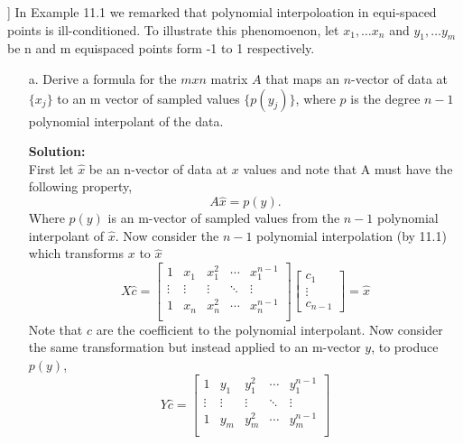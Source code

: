 \documentclass[12pt]{article}
\makeatletter
\theoremstyle{homework}
\newenvironment{exercise}[1]
{\def\@currentlabel{#1}\exercisecore}
{\endexercisecore}
\newcommand{\localhead}[1]{\par\smallskip\noindent\textbf{#1}\nobreak\\}%
\newcommand\solution{\localhead{Solution:}}
\makeatother
\begin{document}
\begin{exercise}[12.2] In Example 11.1 we remarked that polynomial interpoloation in equi-spaced points 
  is ill-conditioned. To illustrate this phenomoenon, let $x_1, \dots x_n$ and  $y_1, \dots y_m$ be n and m equispaced points form 
  -1 to 1 respectively.\\
  \begin{enumerate}
    \item[a.] Derive a formula for the $mxn$ matrix $A$ that maps an $n$-vector of data at $\{x_j\}$ to an 
    m vector of sampled values $\{p(y_j)\}$, where $p$ is the degree $n-1$ polynomial interpolant of the data.\\
   
    \solution First let $\hat{x}$ be an n-vector of data at $x$ values and note that A must have the following property,
    \begin{equation*}
      A\hat{x} = p(y). 
    \end{equation*} 
    Where $p(y)$ is an m-vector of sampled values from the $n-1$ polynomial interpolant of $\hat{x}$. Now consider the $n-1$ polynomial interpolation (by 11.1) 
    which transforms $x$ to $\hat{x}$
    \begin{equation*}
      X\hat{c} = 
      \begin{bmatrix}
        1 & x_1 & x_1^2 & \cdots & x_1^{n-1} \\
        \vdots & \vdots & \vdots & \ddots &\vdots \\
        1 & x_n & x_n^2 & \cdots & x_n^{n-1} \\ 
        \end{bmatrix}
        \begin{bmatrix}
          c_1\\
          \vdots \\
          c_{n-1}
          \end{bmatrix}
           = \hat{x}
    \end{equation*}
    Note that $\hat{c}$ are the coefficient to the polynomial interpolant. Now consider the same transformation but instead applied to an m-vector $y$, to produce $p(y)$,
        \begin{equation*}
      Y\hat{c} = 
      \begin{bmatrix}
        1 & y_1 & y_1^2 & \cdots & y_1^{n-1} \\
        \vdots & \vdots & \vdots & \ddots &\vdots \\
        1 & y_m & y_m^2 & \cdots & y_m^{n-1} \\ 

\end{bmatrix}
\end{equation*}
\end{enumerate}
\end{exercise}
\end{document}
